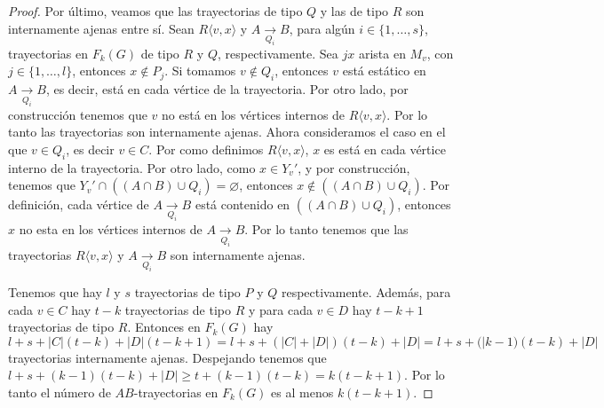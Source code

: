 \begin{proof}
    Por \'ultimo, veamos que las trayectorias de tipo $Q$ y las de tipo $R$ son
    internamente ajenas entre s\'i{}. Sean $R\langle v,x \rangle$ y $A
    \xrightarrow[Q_i]{}  B$, para alg\'un $i \in \{1, \dots, s\}$, trayectorias
    en $F_k(G)$ de tipo $R$ y $Q$, respectivamente. Sea $jx$ arista en $M_v$,
    con $j \in \{1, \dots, l\}$, entonces $x \notin P_j$. Si tomamos $v \notin
    Q_i$, entonces $v$ est\'a est\'atico en $A \xrightarrow[Q_i]{} B$, es decir,
    est\'a en cada v\'ertice de la trayectoria. Por otro lado, por
    construcci\'on tenemos que $v$ no est\'a en los v\'ertices internos de $R
    \langle v, x \rangle$. Por lo tanto las trayectorias son internamente
    ajenas. Ahora consideramos el caso en el que $v \in Q_i$, es decir $v \in
    C$. Por como definimos $R \langle v,x \rangle$, $x$ es est\'a en cada
    v\'ertice interno de la trayectoria. Por otro lado, como $x \in Y_v'$, y por
    construcci\'on, tenemos que $Y_v ' \cap ((A\cap B) \cup Q_i) = \varnothing$,
    entonces $x \notin ((A \cap B) \cup Q_i)$. Por definici\'on, cada v\'ertice
    de $A \xrightarrow[Q_i]{}  B$ est\'a contenido en $((A \cap B) \cup Q_i)$,
    entonces $x$ no esta en los v\'ertices internos de $A \xrightarrow[Q_i]{}
    B$. Por lo tanto tenemos que las trayectorias $R \langle v,x \rangle$ y $A
    \xrightarrow[Q_i]{}  B$ son internamente ajenas.

    Tenemos que hay $l$ y $s$ trayectorias de tipo $P$ y $Q$ respectivamente.
    Adem\'as, para cada $v \in C$ hay $t-k$ trayectorias de tipo $R$ y para cada
    $v \in D$ hay $t-k+1$ trayectorias de tipo $R$. Entonces en $F_k(G)$ hay $l+
    s+ |C|(t-k)+ |D|(t-k +1) = l + s + (|C| + |D|)(t-k) + |D| = l + s +
    (|k-1)(t-k) + |D|$ trayectorias internamente ajenas. Despejando tenemos que
    $l + s + (k-1)(t-k) + |D| \geq t+ (k-1)(t-k) = k (t -k +1)$. Por lo tanto el
    n\'umero de $AB$-trayectorias en $F_k(G)$ es al menos $k(t-k+1)$.
\end {proof}

